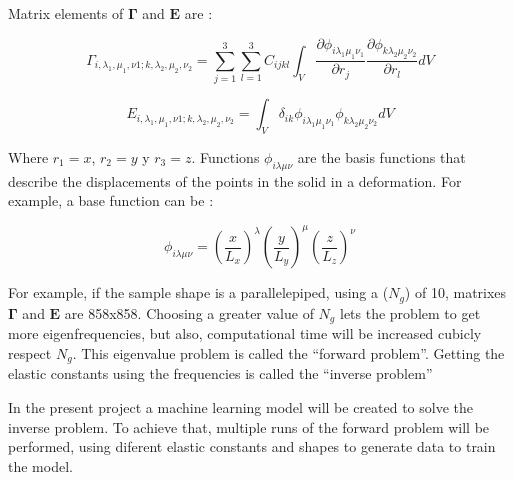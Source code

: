 \documentclass[12pt]{article}
\begin{document}
Matrix elements of $\bm{\Gamma}$ and $\bm{E}$ are \cite{Ohno}: 
 

\begin{equation}
    \Gamma_{i, \lambda_1, \mu_1,  \nu1; k, \lambda_2, \mu_2, \nu_2} = \sum_{j=1}^{3} \sum_{l=1}^{3} {C_{ijkl} \int_{V}{\frac{\partial \phi_{i \lambda_{1} \mu_1 \nu_1}}{\partial r_j} \frac{\partial \phi_{k \lambda_2 \mu_2 \nu_2}}{\partial r_l} dV}}
\end{equation}

\begin{equation}
    E_{i, \lambda_1, \mu_1,  \nu1; k, \lambda_2, \mu_2, \nu_2} = \int_{V}{\delta_{ik} \phi_{i \lambda_1 \mu_1 \nu_1}  \phi_{k \lambda_2 \mu_2 \nu_2} dV}
\end{equation}

Where $r_1 = x$, $r_2 = y$ y  $r_3 = z$. Functions $\phi_{i \lambda \mu \nu}$ are the basis functions that describe the displacements of the points in the solid in a deformation. For example, a base function can be \cite{Demarest}: 

\begin{equation}
    \phi_{i \lambda \mu \nu} = \left(\frac{x}{L_x} \right)^{\lambda} \left(\frac{y}{L_y} \right)^{\mu} \left(\frac{z}{L_z} \right)^{\nu}
\end{equation}

For example, if the sample shape is a parallelepiped, using a ($N_g$) of 10, matrixes $\bm{\Gamma}$ and $\bm{E}$ are 858x858. Choosing a greater value of $N_g$ lets the problem to get more eigenfrequencies, but also, computational time will be increased cubicly respect $N_g$. This eigenvalue problem is called the ``forward problem''. Getting the elastic constants using the frequencies is called the ``inverse problem'' 

In the present project a machine learning model will be created to solve the inverse problem. To achieve that, multiple runs of the forward problem will be performed, using diferent elastic constants and shapes to generate data to train the model.









\vspace{1.5cm}
\end{document}
